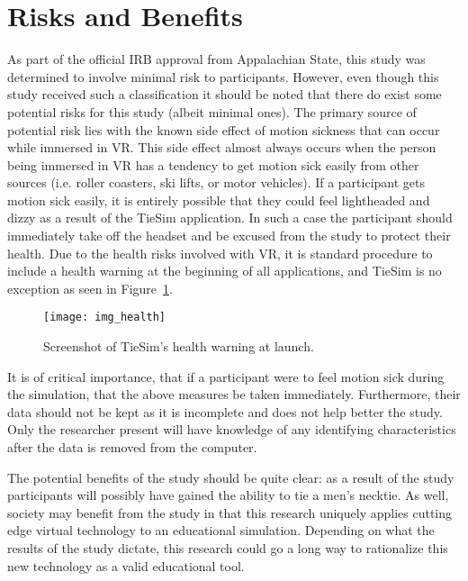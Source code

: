 \section{Risks and Benefits}
\label{sec:risks}

As part of the official IRB approval from Appalachian State, this study was determined to involve minimal risk to participants. However, even though this study received such a classification it should be noted that there do exist some potential risks for this study (albeit minimal ones). The primary source of potential risk lies with the known side effect of motion sickness that can occur while immersed in VR. This side effect almost always occurs when the person being immersed in VR has a tendency to get motion sick easily from other sources (i.e. roller coasters, ski lifts, or motor vehicles). If a participant gets motion sick easily, it is entirely possible that they could feel lightheaded and dizzy as a result of the TieSim application. In such a case the participant should immediately take off the headset and be excused from the study to protect their health. Due to the health risks involved with VR, it is standard procedure to include a health warning at the beginning of all applications, and TieSim is no exception as seen in Figure~\ref{figure:f_health}.

\begin{figure}
  \centering
  \texttt{[image: img\_health]}
  \caption{Screenshot of TieSim's health warning at launch.}
  \label{figure:f_health}
\end{figure}

It is of critical importance, that if a participant were to feel motion sick during the simulation, that the above measures be taken immediately. Furthermore, their data should not be kept as it is incomplete and does not help better the study. Only the researcher present will have knowledge of any identifying characteristics after the data is removed from the computer.

The potential benefits of the study should be quite clear: as a result of the study participants will possibly have gained the ability to tie a men's necktie. As well, society may benefit from the study in that this research uniquely applies cutting edge virtual technology to an educational simulation. Depending on what the results of the study dictate, this research could go a long way to rationalize this new technology as a valid educational tool.

